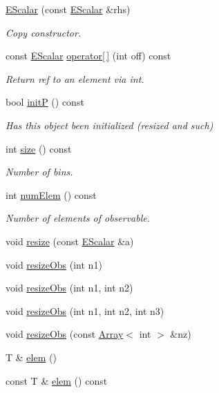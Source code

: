 \begin{DoxyCompactItemize}
\mbox{\hyperlink{classENSEM_1_1EScalar_a002ac4bc9bc6e5ad476613e4edaa827a}{E\+Scalar}} (const \mbox{\hyperlink{classENSEM_1_1EScalar}{E\+Scalar}} \&rhs)
\begin{DoxyCompactList}\small\item\em Copy constructor. \end{DoxyCompactList}\item 
const \mbox{\hyperlink{classENSEM_1_1EScalar}{E\+Scalar}} \mbox{\hyperlink{classENSEM_1_1EScalar_a20c80375941641aca36355253b3479ac}{operator\mbox{[}$\,$\mbox{]}}} (int off) const
\begin{DoxyCompactList}\small\item\em Return ref to an element via int. \end{DoxyCompactList}\item 
bool \mbox{\hyperlink{classENSEM_1_1EScalar_ac5b2f0fbee6aa61f80bcd2d0b4d5188c}{initP}} () const
\begin{DoxyCompactList}\small\item\em Has this object been initialized (resized and such) \end{DoxyCompactList}\item 
int \mbox{\hyperlink{classENSEM_1_1EScalar_a314f162d71b15a8eb7e3382a274aa12b}{size}} () const
\begin{DoxyCompactList}\small\item\em Number of bins. \end{DoxyCompactList}\item 
int \mbox{\hyperlink{classENSEM_1_1EScalar_a63584568dc8b1817a57656cc072205b2}{num\+Elem}} () const
\begin{DoxyCompactList}\small\item\em Number of elements of observable. \end{DoxyCompactList}\item 
void \mbox{\hyperlink{classENSEM_1_1EScalar_aff8eff3acd3686a6ae0b1a1a0dfd6426}{resize}} (const \mbox{\hyperlink{classENSEM_1_1EScalar}{E\+Scalar}} \&a)
\item 
void \mbox{\hyperlink{classENSEM_1_1EScalar_af9faf602be10ce072be3fc532a7e17fe}{resize\+Obs}} (int n1)
\item 
void \mbox{\hyperlink{classENSEM_1_1EScalar_ad4fe54c2fb8a3420e1e452228d8d40b1}{resize\+Obs}} (int n1, int n2)
\item 
void \mbox{\hyperlink{classENSEM_1_1EScalar_a1849b1cf66ab1a983ca9e1f268afd109}{resize\+Obs}} (int n1, int n2, int n3)
\item 
void \mbox{\hyperlink{classENSEM_1_1EScalar_a9273a529024099effecf6962eafa044e}{resize\+Obs}} (const \mbox{\hyperlink{classXMLArray_1_1Array}{Array}}$<$ int $>$ \&nz)
\item 
T \& \mbox{\hyperlink{classENSEM_1_1EScalar_a8de3b840367731efc862fc6943119152}{elem}} ()
\item 
const T \& \mbox{\hyperlink{classENSEM_1_1EScalar_ab3fb9173e700cc3e0bf94ffcb9d04c29}{elem}} () const
\end{DoxyCompactItemize}
